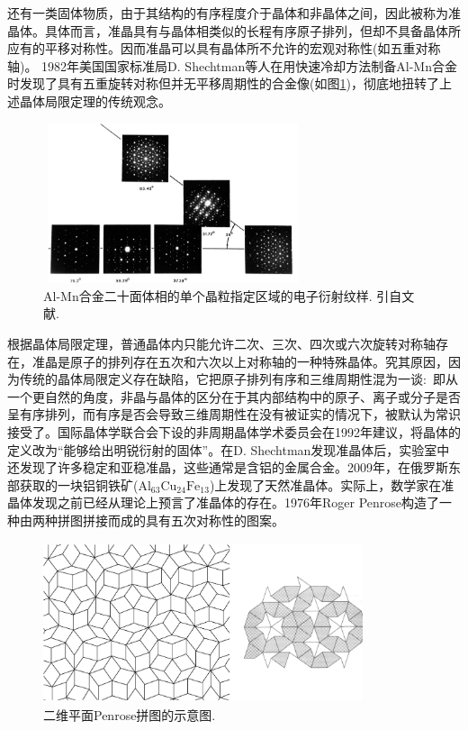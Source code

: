 还有一类固体物质，由于其结构的有序程度介于晶体和非晶体之间，因此被称为准晶体。具体而言，准晶具有与晶体相类似的长程有序原子排列，但却不具备晶体所应有的平移对称性。因而准晶可以具有晶体所不允许的宏观对称性(如五重对称轴)。%
1982年美国国家标准局D. Shechtman等人在用快速冷却方法制备Al-Mn合金时发现了具有五重旋转对称但并无平移周期性的合金像(如图\ref{Fig:SSI-03})，彻底地扭转了上述晶体局限定理的传统观念。
\begin{figure}[h!]
\centering
\vspace*{-0.1in}
\includegraphics[height=1.85in,width=3.0in,viewport=0 0 791 504,clip]{Figures/quasicrystal.png}
\caption{\small \textrm{Al-Mn合金二十面体相的单个晶粒指定区域的电子衍射纹样. 引自文献.}}%
\label{Fig:SSI-03}
\end{figure}
根据晶体局限定理，普通晶体内只能允许二次、三次、四次或六次旋转对称轴存在，准晶是原子的排列存在五次和六次以上对称轴的一种特殊晶体。究其原因，因为传统的晶体局限定义存在缺陷，它把原子排列有序和三维周期性混为一谈:~即从一个更自然的角度，非晶与晶体的区分在于其内部结构中的原子、离子或分子是否呈有序排列，而有序是否会导致三维周期性在没有被证实的情况下，被默认为常识接受了。国际晶体学联合会下设的非周期晶体学术委员会在1992年建议，将晶体的定义改为``能够给出明锐衍射的固体''。在D. Shechtman发现准晶体后，实验室中还发现了许多稳定和亚稳准晶，这些通常是含铝的金属合金。2009年，在俄罗斯东部获取的一块铝铜铁矿($\mathrm{Al}_{63}\mathrm{Cu}_{24}\mathrm{Fe}_{13}$)上发现了天然准晶体。实际上，数学家在准晶体发现之前已经从理论上预言了准晶体的存在。1976年Roger Penrose构造了一种由两种拼图拼接而成的具有五次对称性的图案。
\begin{figure}[h!]
\centering
\vspace*{-0.1in}
\includegraphics[height=1.85in,width=3.7in,viewport=0 0 1931 939,clip]{Figures/Penrose-puzzle.png}
\caption{\small \textrm{二维平面Penrose拼图的示意图.}}%
\label{Fig:Penrose-puzzle}
\end{figure}
